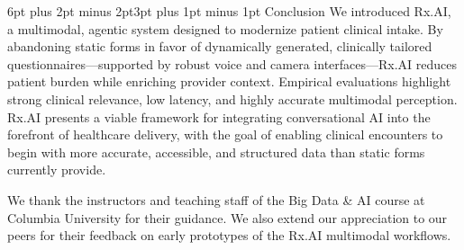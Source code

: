 \documentclass[sigplan,screen]{acmart}
\makeatletter
\renewcommand{\section}{\@startsection{section}{1}{\z@}
  {6pt plus 2pt minus 2pt}{3pt plus 1pt minus 1pt}
  {\normalfont\large\bfseries}}
\makeatother
\begin{document}
\section{Conclusion}
We introduced Rx.AI, a multimodal, agentic system designed to modernize patient clinical intake. By abandoning static forms in favor of dynamically generated, clinically tailored questionnaires—supported by robust voice and camera interfaces—Rx.AI reduces patient burden while enriching provider context. Empirical evaluations highlight strong clinical relevance, low latency, and highly accurate multimodal perception. Rx.AI presents a viable framework for integrating conversational AI into the forefront of healthcare delivery, with the goal of enabling clinical encounters to begin with more accurate,
accessible, and structured data than static forms currently provide.

\begin{acks}
We thank the instructors and teaching staff of the Big Data \& AI course at Columbia University for their guidance. We also extend our appreciation to our peers for their feedback on early prototypes of the Rx.AI multimodal workflows.
\end{acks}
\end{document}

